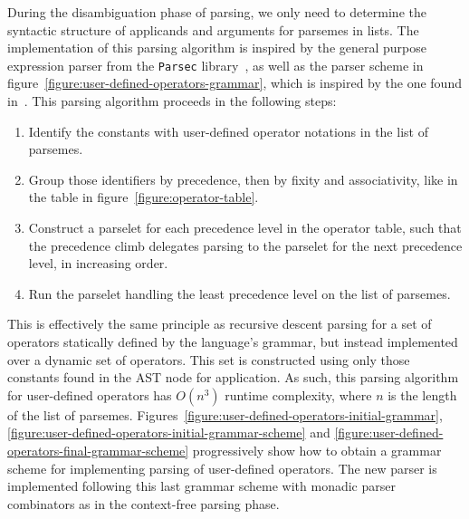 During the disambiguation phase of parsing, we only need to determine the syntactic structure of applicands and arguments for parsemes in lists.
The implementation of this parsing algorithm is inspired by the general purpose expression parser from the \texttt{Parsec} library~\cite{leijen2001parsec}, as well as the parser scheme in figure~\ref{figure:user-defined-operators-grammar}, which is inspired by the one found in~\cite{danielsson2008parsing}.
This parsing algorithm proceeds in the following steps:
\begin{enumerate}
\item Identify the constants with user-defined operator notations in the list of parsemes.
\item Group those identifiers by precedence, then by fixity and associativity, like in the table in figure~\ref{figure:operator-table}.
\item Construct a parselet for each precedence level in the operator table, such that the precedence climb delegates parsing to the parselet for the next precedence level, in increasing order.
\item Run the parselet handling the least precedence level on the list of parsemes.
\end{enumerate}
This is effectively the same principle as recursive descent parsing for a set of operators statically defined by the language's grammar, but instead implemented over a dynamic set of operators.
This set is constructed using only those constants found in the \ac{AST} node for application.
As such, this parsing algorithm for user-defined operators has $ O(n^3) $ runtime complexity, where $ n $ is the length of the list of parsemes.
Figures~\ref{figure:user-defined-operators-initial-grammar}, \ref{figure:user-defined-operators-initial-grammar-scheme} and \ref{figure:user-defined-operators-final-grammar-scheme} progressively show how to obtain a grammar scheme for implementing parsing of user-defined operators.
The new parser is implemented following this last grammar scheme with monadic parser combinators as in the context-free parsing phase.

